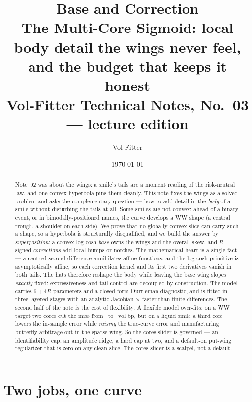 \documentclass[11pt]{article}
\title{\textbf{Base and Correction}\\[2pt]
\large The Multi-Core Sigmoid: local body detail the wings never feel,
and the budget that keeps it honest\\[2pt]
\normalsize Vol-Fitter Technical Notes, No.~03 --- lecture edition}
\author{Vol-Fitter}
\date{\today}
\begin{document}
\maketitle


\begin{abstract}
Note~02 was about the wings: a smile's tails are a moment reading of the
risk-neutral law, and one convex hyperbola pins them cleanly.  This note fixes
the wings as a solved problem and asks the complementary question --- how to add
detail in the \emph{body} of a smile without disturbing the tails at all.  Some
smiles are not convex: ahead of a binary event, or in bimodally-positioned
names, the curve develops a WW shape (a central trough, a shoulder on each
side).  We prove that no globally convex slice can carry such a shape, so a
hyperbola is structurally disqualified, and we build the answer by
\emph{superposition}: a convex log-cosh \emph{base} owns the wings and the
overall skew, and $R$ signed \emph{corrections} add local humps or notches.  The
mathematical heart is a single fact --- a centred second difference annihilates
affine functions, and the log-cosh primitive is asymptotically affine, so each
correction kernel and its first two derivatives vanish in both tails.  The hats
therefore reshape the body while leaving the base wing slopes \emph{exactly}
fixed: expressiveness and tail control are decoupled by construction.  The
model carries $6+4R$ parameters and a closed-form Durrleman diagnostic, and is
fitted in three layered stages with an analytic Jacobian \mcscorrspeedup$\times$
faster than finite differences.  The second half of the note is the cost of
flexibility.  A flexible model over-fits: on a WW target two cores cut the miss
from \mcscorrbasemaxerr\ to \mcscorrmaxerr\ vol bp, but on a liquid smile a
third core lowers the in-sample error while \emph{raising} the true-curve error
and manufacturing butterfly arbitrage out in the sparse wing.  So the cores
slider is governed --- an identifiability cap, an amplitude ridge, a hard cap at
two, and a default-on put-wing regularizer that is zero on any clean slice.  The
cores slider is a scalpel, not a default.
\end{abstract}

\newpage
\tableofcontents
\newpage

\section{Two jobs, one curve}
\label{sec:two}
\end{document}
